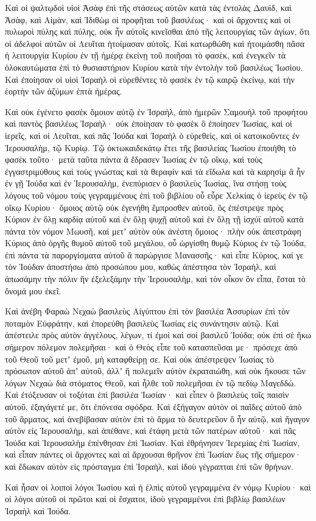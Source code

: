 {Καὶ οἱ ψαλτῳδοὶ υἱοὶ Ἀσὰφ ἐπὶ τῆς στάσεως αὐτῶν κατὰ τὰς ἐντολὰς Δαυὶδ, καὶ Ἀσὰφ, καὶ Αἰμὰν, καὶ Ἰδιθὼμ οἱ προφῆται τοῦ βασιλέως· καὶ οἱ ἄρχοντες καὶ οἱ πυλωροὶ πύλης καὶ πύλης, οὐκ ἦν αὐτοῖς κινεῖσθαι ἀπὸ τῆς λειτουργίας τῶν ἁγίων, ὅτι οἱ ἀδελφοὶ αὐτῶν οἱ Λευῖται ἡτοίμασαν αὐτοῖς.
Καὶ κατωρθώθη καὶ ἡτοιμάσθη πᾶσα ἡ λειτουργία Κυρίου ἐν τῇ ἡμέρᾳ ἐκείνῃ τοῦ ποιῆσαι τὸ φασὲκ, καὶ ἐνεγκεῖν τὰ ὁλοκαυτώματα ἐπὶ τὸ θυσιαστήριον Κυρίου κατὰ τὴν ἐντολὴν τοῦ βασιλέως Ἰωσίου.
Καὶ ἐποίησαν οἱ υἱοὶ Ἰσραὴλ οἱ εὑρεθέντες τὸ φασὲκ ἑν τῷ καιρῷ ἐκείνῳ, καὶ τὴν ἑορτὴν τῶν ἀζύμων ἑπτὰ ἡμέρας.
\par }{\PP {}Καὶ οὐκ ἐγένετο φασὲκ ὅμοιον αὐτῷ ἐν Ἰσραὴλ, ἀπὸ ἡμερῶν Σαμουὴλ τοῦ προφήτου καὶ παντὸς βασιλέως Ἰσραὴλ· οὐκ ἐποίησαν τὸ φασὲκ ὃ ἐποίησεν Ἰωσίας, καὶ οἱ ἱερεῖς, καὶ οἱ Λευῖται, καὶ πᾶς Ἰούδα καὶ Ἰσραὴλ ὁ εὑρεθεὶς, καὶ οἱ κατοικοῦντες ἐν Ἱερουσαλὴμ, τῷ Κυρίῳ.
Τῷ ὀκτωκαιδεκάτῳ ἔτει τῆς βασιλείας Ἰωσίου ἐποιήθη τὸ φασὲκ τοῦτο· μετὰ ταῦτα πάντα ἃ ἔδρασεν Ἰωσίας ἐν τῷ οἴκῳ,
καὶ τοὺς ἐγγαστριμύθους καὶ τοὺς γνώστας καὶ τὰ θεραφὶν καὶ τὰ εἴδωλα καὶ τὰ καρησὶμ ἃ ἦν ἐν γῇ Ἰούδα καὶ ἐν Ἱερουσαλὴμ, ἐνεπύρισεν ὁ βασιλεὺς Ἰωσίας, ἵνα στήσῃ τοὺς λόγους τοῦ νόμου τοὺς γεγραμμένους ἐπὶ τοῦ βιβλίου οὗ εὗρε Χελκίας ὁ ἱερεὺς ἐν τῷ οἴκῳ Κυρίου·
ὅμοιος αὐτῷ οὐκ ἐγενήθη ἔμπροσθεν αὐτοῦ, ὃς ἐπέστρεψε πρὸς Κύριον ἐν ὅλῃ καρδίᾳ αὐτοῦ καὶ ἐν ὅλῃ ψυχῇ αὐτοῦ καὶ ἐν ὅλῃ τῇ ἰσχύϊ αὐτοῦ κατὰ πάντα τὸν νόμον Μωυσῆ, καὶ μετʼ αὐτὸν οὐκ ἀνέστη ὅμοιος·
πλὴν οὐκ ἀπεστράφη Κύριος ἀπὸ ὀργῆς θυμοῦ αὐτοῦ τοῦ μεγάλου, οὗ ὠργίσθη θυμῷ Κύριος ἐν τῷ Ἰούδα, ἐπὶ πάντα τὰ παροργίσματα αὐτοῦ ἂ παρώργισε Μανασσῆς·
καὶ εἶπε Κύριος, καί γε τὸν Ἰούδαν ἀποστήσω ἀπὸ προσώπου μου, καθὼς ἀπέστησα τὸν Ἰσραὴλ, καὶ ἀπωσάμην τὴν πόλιν ἣν ἐξελεξάμην τὴν Ἱερουσαλὴμ, καὶ τὸν οἶκον ὃν εἶπα, ἔσται τὸ ὄνομά μου ἐκεῖ.
\par }{\PP {}Καὶ ἀνέβη Φαραὼ Νεχαὼ βασιλεὺς Αἰγύπτου ἐπὶ τὸν βασιλέα Ἀσσυρίων ἐπὶ τὸν ποταμὸν Εὐφράτην, καὶ ἐπορεύθη βασιλεὺς Ἰωσίας εἰς συνάντησιν αὐτῷ.
Καὶ ἀπέστειλε πρὸς αὐτὸν ἀγγέλους, λέγων, τί ἐμοὶ καὶ σοί βασιλεῦ Ἰούδα; οὐκ ἐπὶ σὲ ἥκω σήμερον πόλεμον πολεμῆσαι· καὶ ὁ Θεὸς εἶπε τοῦ κατασπεῦσαι με· πρόσεχε ἀπὸ τοῦ Θεοῦ τοῦ μετʼ ἐμοῦ, μὴ καταφθείρῃ σε.
Καὶ οὐκ ἀπέστρεψεν Ἰωσίας τὸ πρόσωπον αὐτοῦ ἀπʼ αὐτοῦ, ἀλλʼ ἢ πολεμεῖν αὐτὸν ἐκραταιώθη, καὶ οὐκ ἤκουσε τῶν λόγων Νεχαὼ διὰ στόματος Θεοῦ, καὶ ἦλθε τοῦ πολεμῆσαι ἐν τῷ πεδίῳ Μαγεδδώ.
Καὶ ἐτόξευσαν οἱ τοξόται ἐπὶ βασιλέα Ἰωσίαν· καὶ εἶπεν ὁ βασιλεὺς τοῖς παισὶν αὐτοῦ, ἐξαγάγετέ με, ὅτι ἐπόνεσα σφόδρα.
Καὶ ἐξήγαγον αὐτὸν οἱ παῖδες αὐτοῦ ἀπὸ τοῦ ἅρματος, καὶ ἀνεβίβασαν αὐτὸν ἐπὶ τὸ ἅρμα τὸ δευτερεῦον ὃ ἦν αὐτῷ, καὶ ἤγαγον αὐτὸν εἰς Ἱερουσαλὴμ, καὶ ἀπέθανε, καὶ ἐτάφη μετὰ τῶν πατέρων αὐτοῦ· καὶ πᾶς Ἰούδα καὶ Ἱερουσαλὴμ ἐπένθησαν ἐπὶ Ἰωσίαν.
Καὶ ἐθρήνησεν Ἱερεμίας ἐπὶ Ἰωσίαν, καὶ εἶπαν πάντες οἱ ἄρχοντες καὶ αἱ ἄρχουσαι θρῆνον ἐπὶ Ἰωσίαν ἕως τῆς σήμερον· καὶ ἔδωκαν αὐτὸν εἰς πρόσταγμα ἐπὶ Ἰσραὴλ, καὶ ἰδοὺ γέγραπται ἐπὶ τῶν θρήνων.
\par }{\PP {}Καὶ ἦσαν οἱ λοιποὶ λόγοι Ἰωσίου καὶ ἡ ἐλπὶς αὐτοῦ γεγραμμένα ἐν νόμῳ Κυρίου·
καὶ οἱ λόγοι αὐτοῦ οἱ πρῶτοι καὶ οἱ ἔσχατοι, ἰδοὺ γεγραμμένοι ἐπὶ βιβλίῳ βασιλέων Ἰσραὴλ καὶ Ἰούδα.

}
